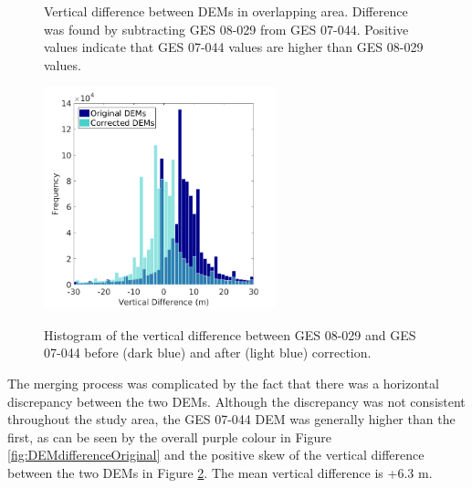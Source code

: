 \documentclass{sfuthesis}
\begin{document}
{\begin{figure}[H]
    \caption[Vertical difference between DEMs in overlapping area]{Vertical difference between DEMs in overlapping area. Difference was found by subtracting GES 08-029 from GES 07-044. Positive values indicate that GES 07-044 values are higher than GES 08-029 values. }
 \label{fig:DEMdifference}
\end{figure}    
    
\begin{figure}
	\centering
	\includegraphics[width = 0.6\textwidth]{DEMcorrection_hist.png}\\
	\caption[Histogram of the vertical difference between GES 08-029 and GES 07-044 before and after correction.]{Histogram of the vertical difference between GES 08-029 and GES 07-044 before (dark blue) and after (light blue) correction. }
	\label{fig:DEMcorrection_hist}
\end{figure}    
    

The merging process was complicated by the fact that there was a horizontal discrepancy between the two DEMs. Although the discrepancy was not consistent throughout the study area, the GES 07-044 DEM was generally higher than the first, as can be seen by the overall purple colour in Figure \ref{fig:DEMdifferenceOriginal} and the positive skew of the vertical difference between the two DEMs in Figure \ref{fig:DEMcorrection_hist}. The mean vertical difference is +6.3 m.


}
\end{document}
